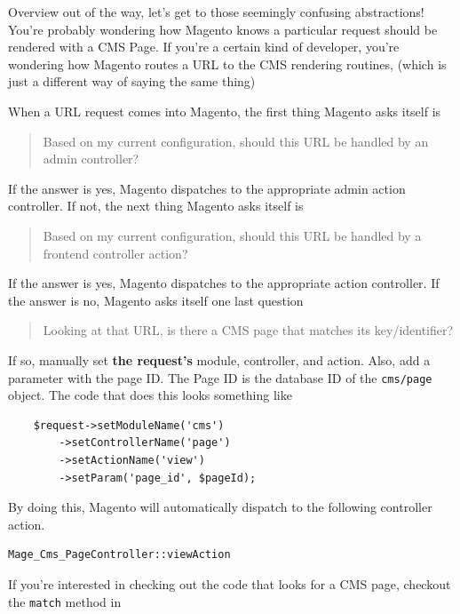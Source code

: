 \documentclass[oneside]{book}
\begin{document}
Overview out of the way, let's get to those seemingly confusing abstractions!  You're probably wondering how Magento knows a particular request should be rendered with a CMS Page.  If you're a certain kind of developer, you're wondering how Magento routes a URL to the CMS rendering routines, (which is just a different way of saying the same thing)

When a URL request comes into Magento, the first thing Magento asks itself is

\begin{quote}
Based on my current configuration, should this URL be handled by an admin controller?
\end{quote}

If the answer is yes, Magento dispatches to the appropriate admin action controller. If not, the next thing Magento asks itself is

\begin{quote}
Based on my current configuration, should this URL be handled by a frontend controller action?
\end{quote}

If the answer is yes, Magento dispatches to the appropriate action controller.   If the answer is no, Magento asks itself one last question

\begin{quote}
Looking at that URL, is there a CMS page that matches its key/identifier?
\end{quote}

If so, manually set \textbf{the request's} module, controller, and action.  Also, add a parameter with the page ID.  The Page ID is the database ID of the \footnotesize\texttt{cms/page} \normalsize  object.  The code that does this looks something like

\begin{lstlisting}
    $request->setModuleName('cms')
        ->setControllerName('page')
        ->setActionName('view')
        ->setParam('page_id', $pageId);

\end{lstlisting}


By doing this, Magento will automatically dispatch to the following controller action.

\begin{lstlisting}
Mage_Cms_PageController::viewAction

\end{lstlisting}


If you're interested in checking out the code that looks for a CMS page, checkout the \footnotesize\texttt{match} \normalsize  method in
\end{document}
